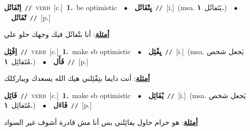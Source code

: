 \documentclass[10pt,a4paper,twoside]{article} %
\begin{document}
\begin{multicols}{2}
{{\setlength\topsep{0pt}\textbf{\foreignlanguage{arabic}{اِتْفَائَل}}\ {\color{gray}\texttt{//}\color{black}}\ \textsc{verb}\ [c.]\ \textbf{1.}~be optimistic\ \ $\bullet$\ \ \setlength\topsep{0pt}\textbf{\foreignlanguage{arabic}{يِتْفَائَل}}\ {\color{gray}\texttt{//}\color{black}}\ [i.]\ \color{gray}(msa. \foreignlanguage{arabic}{يَتَفائَل}~\foreignlanguage{arabic}{\textbf{١.}})\color{black}\ \ $\bullet$\ \ \setlength\topsep{0pt}\textbf{\foreignlanguage{arabic}{تْفَائَل}}\ {\color{gray}\texttt{//}\color{black}}\ [p.]\  \begin{flushright}\color{gray}\foreignlanguage{arabic}{\textbf{\underline{\foreignlanguage{arabic}{أمثلة}}}: أنا بتْفائَل فيك وجهك حلو علي}\end{flushright}\color{black}} \vspace{2mm}

{\setlength\topsep{0pt}\textbf{\foreignlanguage{arabic}{اِفْئِل}}\ {\color{gray}\texttt{//}\color{black}}\ \textsc{verb}\ [c.]\ \textbf{1.}~make sb optimistic\ \ $\bullet$\ \ \setlength\topsep{0pt}\textbf{\foreignlanguage{arabic}{يِفْئِل}}\ {\color{gray}\texttt{//}\color{black}}\ [i.]\ \color{gray}(msa. \foreignlanguage{arabic}{يَجعل شخص مُتَفائِل}~\foreignlanguage{arabic}{\textbf{١.}})\color{black}\ \ $\bullet$\ \ \setlength\topsep{0pt}\textbf{\foreignlanguage{arabic}{فَأَل}}\ {\color{gray}\texttt{//}\color{black}}\ [p.]\  \begin{flushright}\color{gray}\foreignlanguage{arabic}{\textbf{\underline{\foreignlanguage{arabic}{أمثلة}}}: أنت دايما بتِفْئِلني هيك الله يسعدك ويباركلك}\end{flushright}\color{black}} \vspace{2mm}

{\setlength\topsep{0pt}\textbf{\foreignlanguage{arabic}{فَائِل}}\ {\color{gray}\texttt{//}\color{black}}\ \textsc{verb}\ [c.]\ \textbf{1.}~make sb optimistic\ \ $\bullet$\ \ \setlength\topsep{0pt}\textbf{\foreignlanguage{arabic}{يْفَائِل}}\ {\color{gray}\texttt{//}\color{black}}\ [i.]\ \color{gray}(msa. \foreignlanguage{arabic}{يَجعل شخص مُتَفائِل}~\foreignlanguage{arabic}{\textbf{١.}})\color{black}\ \ $\bullet$\ \ \setlength\topsep{0pt}\textbf{\foreignlanguage{arabic}{فَاءَل}}\ {\color{gray}\texttt{//}\color{black}}\ [p.]\  \begin{flushright}\color{gray}\foreignlanguage{arabic}{\textbf{\underline{\foreignlanguage{arabic}{أمثلة}}}: هو حرام حاول يفائِلني بس أنا مش قادرة أشوف غير السواد}\end{flushright}\color{black}} \vspace{2mm}

}
\end{multicols}
\end{document}

